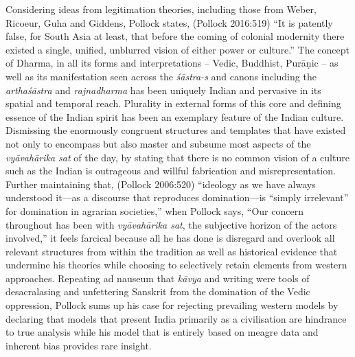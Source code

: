 Considering ideas from legitimation theories, including those from Weber, Ricoeur, Guha and Giddens, Pollock states, (Pollock 2016:519) “It is patently false, for South Asia at least, that before the coming of colonial modernity there existed a single, unified, unblurred vision of either power or culture.” The concept of Dharma, in all its forms and interpretations – Vedic, Buddhist, Purāṇic – as well as its manifestation seen across the \textit{śāstra-s} and canons including the \textit{arthaśāstra} and \textit{rajnadharma} has been uniquely Indian and pervasive in its spatial and temporal reach. Plurality in external forms of this core and defining essence of the Indian spirit has been an exemplary feature of the Indian culture. Dismissing the enormously congruent structures and templates that have existed not only to encompass but also master and subsume most aspects of the \textit{vyāvahārika sat} of the day, by stating that there is no common vision of a culture such as the Indian is outrageous and willful fabrication and misrepresentation. Further maintaining that, (Pollock 2006:520) “ideology as we have always understood it—as a discourse that reproduces domination—is “simply irrelevant” for domination in agrarian societies,” when Pollock says, “Our concern throughout has been with \textit{vyāvahārika sat}, the subjective horizon of the actors involved,” it feels farcical because all he has done is disregard and overlook all relevant structures from within the tradition as well as historical evidence that undermine his theories while choosing to selectively retain elements from western approaches. Repeating ad nauseum that \textit{kāvya} and writing were tools of desacralasing and unfettering Sanskrit from the domination of the Vedic oppression, Pollock sums up his case for rejecting prevailing western models by declaring that models that present India primarily as a civilisation are hindrance to true analysis while his model that is entirely based on meagre data and inherent bias provides rare insight.

